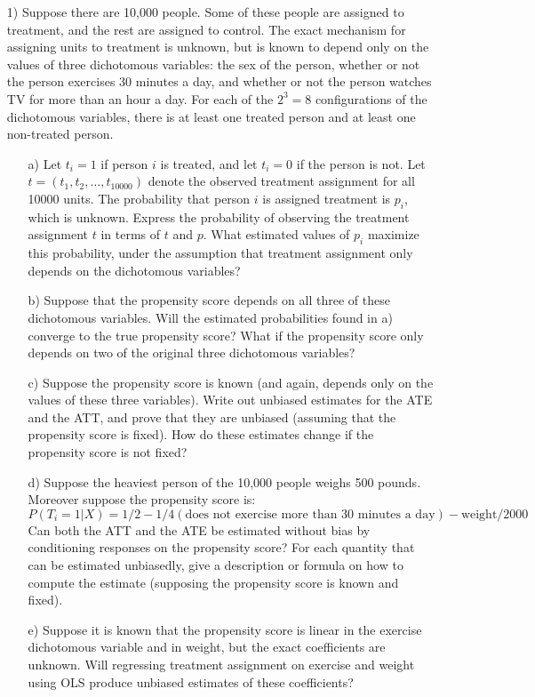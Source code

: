 \documentclass{article}
\begin{document}
\begin{itemize}
  \item[1)]
    Suppose there are 10,000 people.
    Some of these people are assigned to treatment, and the rest are assigned to control.
    The exact mechanism for assigning units to treatment is unknown,
    but is known to depend only on the values of three dichotomous variables:
    the sex of the person, 
    whether or not the person exercises 30 minutes a day, 
    and whether or not the person watches TV for more than an hour a day.
    For each of the $2^3 = 8$ configurations of the dichotomous variables, 
    there is at least one treated person and at least one non-treated person.
  \begin{itemize}
    \item[a)]
      Let $t_i = 1$ if person $i$ is treated, and let $t_i = 0$ if the person is not.
      Let $t = (t_1,t_2,\ldots,t_{10000})$ denote the 
      observed treatment assignment for all 10000 units.
      The probability that person $i$ is assigned treatment is $p_i$, which is unknown.
      Express the probability of observing the treatment assignment $t$ in terms of $t$ and $p$.
      What estimated values of $p_i$ maximize this probability, 
      under the assumption that treatment
      assignment only depends on the dichotomous variables?     
    \item[b)]  
      Suppose that the propensity score depends on all three of these dichotomous
      variables.  
      Will the estimated probabilities found in a) converge to the true propensity score?
      What if the propensity score only depends on two of the
      original three dichotomous variables?
    \item[c)]
      Suppose the propensity score is known (and again, depends only on the values of 
      these three variables).  
      Write out unbiased estimates for the ATE and the ATT, 
      and prove that they are unbiased (assuming that the propensity score is fixed).
      How do these estimates change if the propensity score is not fixed? 
    \item[d)]
      Suppose the heaviest person of the 10,000 people weighs 500 pounds.
      Moreover suppose the propensity score is:
      $$
        P(T_i =1 | X) = 1/2 - 1/4(\text{does not exercise more than 30 minutes a day}) - 
        \text{weight}/2000
      $$
      Can both the ATT and the ATE be estimated without bias by
      conditioning responses on the propensity score?  
      For each quantity that can be estimated unbiasedly, 
      give a description or formula on how to compute the estimate (supposing the
      propensity score is known and fixed).
    \item[e)]
      Suppose it is known that the propensity score is linear 
      in the exercise dichotomous
      variable and in weight, but the exact coefficients are unknown.
      Will regressing treatment assignment on 
      exercise and weight using OLS produce unbiased estimates of these coefficients?      
  \end{itemize}
\end{itemize}    
\end{document}
